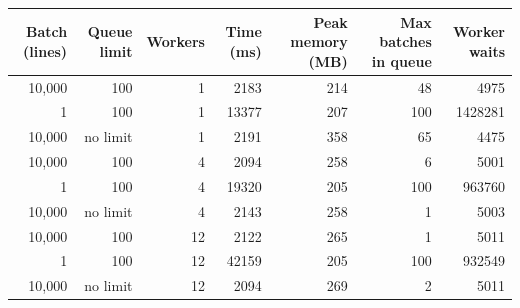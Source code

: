 \begin{tabular}{rrrrrrr}
\toprule
Batch (lines) & Queue limit & Workers & Time (ms) & Peak memory (MB) & Max batches in queue & Worker waits \\
\midrule
10,000 & 100 & 1 & 2183 & 214 & 48 & 4975 \\
1 & 100 & 1 & 13377 & 207 & 100 & 1428281 \\
10,000 & no limit & 1 & 2191 & 358 & 65 & 4475 \\
10,000 & 100 & 4 & 2094 & 258 & 6 & 5001 \\
1 & 100 & 4 & 19320 & 205 & 100 & 963760 \\
10,000 & no limit & 4 & 2143 & 258 & 1 & 5003 \\
10,000 & 100 & 12 & 2122 & 265 & 1 & 5011 \\
1 & 100 & 12 & 42159 & 205 & 100 & 932549 \\
10,000 & no limit & 12 & 2094 & 269 & 2 & 5011 \\
\bottomrule
\end{tabular}
